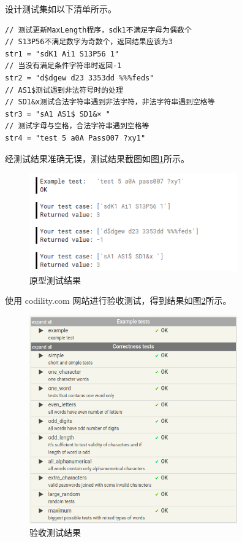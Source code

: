 \begin{spacing}{1.5}
    设计测试集如以下清单所示。
\begin{lstlisting}
// 测试更新MaxLength程序，sdk1不满足字母为偶数个
// S13P56不满足数字为奇数个，返回结果应该为3
str1 = "sdK1 Ai1 S13P56 1" 
// 当没有满足条件字符串时返回-1
str2 = "d$dgew d23 3353dd %%%feds"
// AS1$测试遇到非法符号时的处理
// SD1&x测试合法字符串遇到非法字符，非法字符串遇到空格等
str3 = "sA1 AS1$ SD1&× "
// 测试字母与空格，合法字符串遇到空格等
str4 = "test 5 a0A Pass007 ?xy1"
\end{lstlisting}

    经测试结果准确无误，测试结果截图如图\ref{fig:result}所示。
\begin{figure}[htbp]
    \centering
    {\includegraphics[width=0.8\textwidth]{./figure/result0.png}
    \caption{原型测试结果}
    \label{fig:result}}
\end{figure}


    使用 codility.com 网站进行验收测试，得到结果如图\ref{fig:test}所示。

\begin{figure}[htbp]
    \centering
    {\includegraphics[width=0.8\textwidth]{./figure/test_result.png}
    \caption{验收测试结果}
    \label{fig:test}}
\end{figure}


\end{spacing}
